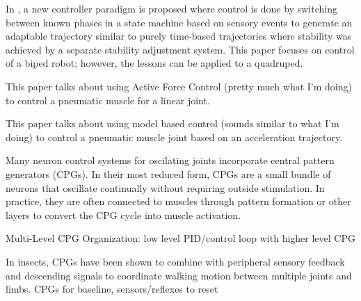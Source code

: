 In \cite{EventBasedWalking}, a new controller paradigm is proposed where control
is done by switching between known phases in a state machine based on sensory
events to generate an adaptable trajectory similar to purely time-based
trajectories where stability was achieved by a separate stability adjustment
system. This paper focuses on control of a biped robot; however, the lessons can
be applied to a quadruped.


This paper talks about using Active Force Control (pretty much what I'm doing)
to control a pneumatic muscle for a linear joint.
\cite{Jahanabadi2009}

This paper talks about using model based control (sounds similar to what I'm 
doing) to control a pneumatic muscle joint based on an acceleration trajectory.
\cite{Wang2013}



Many neuron control systems for oscilating joints incorporate central pattern
generators (CPGs). In their most reduced form, CPGs are a small bundle of
neurons that oscillate continually without requiring outside stimulation. In
practice, they are often connected to muscles through pattern formation or other
layers to convert the CPG cycle into muscle activation.
\cite{CPGReview}

Multi-Level CPG Organization: low level PID/control loop with higher level CPG
\cite{MultiLevelCPG}

In insects, CPGs have been shown to combine with peripheral sensory feedback and
descending signals to coordinate walking motion between multiple joints and
limbs.
CPGs for baseline, sensors/reflexes to reset \cite{SixLeggedWalking}

